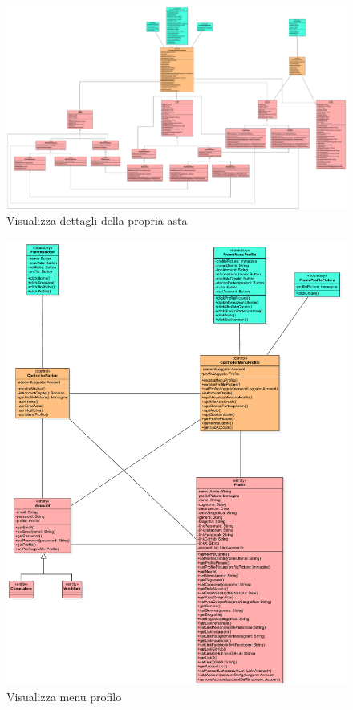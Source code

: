             \begin{figure}[htbp!]
                \centering
                    \includegraphics[width=1\linewidth]{Immagini/Diagrammi/Class Diagram/Analisi/Utente che ha effettuato l'accesso/VisualizzaDettagliPropriaAsta.pdf}
                \caption{Visualizza dettagli della propria asta}
            \end{figure}
            
            \begin{figure}[htbp!]
                \centering
                    \includegraphics[width=1\linewidth]{Immagini/Diagrammi/Class Diagram/Analisi/Utente che ha effettuato l'accesso/VisualizzaMenuProfilo.pdf}
                \caption{Visualizza menu profilo}
            \end{figure}
            
